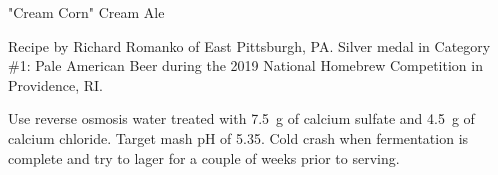 \begin{recipe}{"Cream Corn" Cream Ale}

\begin{aboutblock}
Recipe by Richard Romanko of East Pittsburgh, PA. Silver medal in Category
\#1: Pale American Beer during the 2019 National Homebrew Competition
in Providence, RI. \sourceaha
\end{aboutblock}
 

\begin{methodandtiming}
 
\begin{mashsteps}
\end{mashsteps}

\begin{directions}
Use reverse osmosis water treated with 7.5~g of calcium sulfate and 4.5~g of calcium
chloride. Target mash pH of 5.35. Cold crash when fermentation is complete and
try to lager for a couple of weeks prior to serving.
\end{directions}

\end{methodandtiming}

\recipebreak

\begin{ingredientsblock}

\begin{malts}
\end{malts}

\begin{hops}
\end{hops}


\end{ingredientsblock}

\end{recipe}


